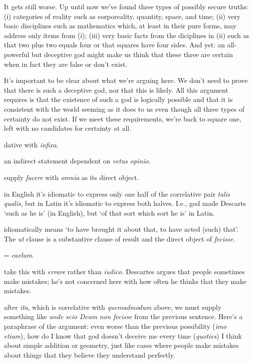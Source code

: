\prenotes

It gets still worse. Up until now we've found three types of possibly secure truths: (i) categories of reality such as corporeality, quantity, space, and time; (ii) very basic disciplines such as mathematics which, at least in their pure forms, may address only items from (i); (iii) very basic facts from the diciplines in (ii) such as that two plus two equals four or that squares have four sides. And yet: an all-powerful but deceptive god might make us think that these three are certain when in fact they are false or don't exist.

It's important to be clear about what we're arguing here. We don't need to prove that there is such a deceptive god, nor that this is likely. All this argument requires is that the existence of such a god is logically possible and that it is consistent with the world seeming as it does to us even though all three types of certainty do not exist. If we meet these requirements, we're back to square one, left with no candidates for certainty at all.

 dative with \textit{infixa}.

 an indirect statement dependent on \textit{vetus opinio}.

 supply \textit{facere} with \textit{omnia} as its direct object.

 in English it's idiomatic to express only one half of the correlative pair \textit{talis qualis}, but in Latin it's idiomatic to express both halves. I.e., god made Descarts `such as he is' (in English), but `of that sort which sort he is' in Latin.

 idiomatically means `to have brought it about that, to have acted (such) that'. The \textit{ut} clause is a substantive clause of result and the direct object of \textit{fecisse}.

 = \textit{caelum}.

 take this with \textit{errare} rather than \textit{iudico}. Descartes argues that people sometimes make mistakes; he's not concerned here with how often he thinks that they make mistakes.

 after \textit{ita}, which is correlative with \textit{quemadmodum} above, we must supply something like \textit{unde scio Deum non fecisse} from the previous sentence. Here's a paraphrase of the argument: even worse than the previous possibility (\textit{imo etiam}), how do I know that god doesn't deceive me every time (\textit{quoties}) I think about simple addition or geometry, just like cases where people make mistakes about things that they believe they understand perfectly.

